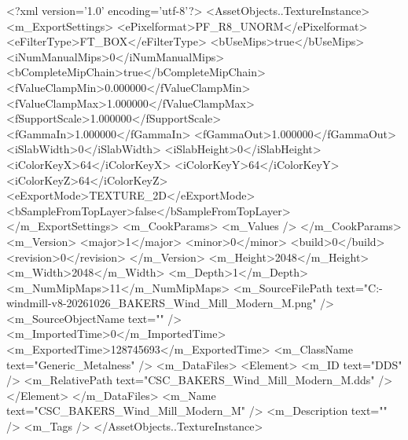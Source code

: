 <?xml version='1.0' encoding='utf-8'?>
<AssetObjects..TextureInstance>
  <m_ExportSettings>
    <ePixelformat>PF_R8_UNORM</ePixelformat>
    <eFilterType>FT_BOX</eFilterType>
    <bUseMips>true</bUseMips>
    <iNumManualMips>0</iNumManualMips>
    <bCompleteMipChain>true</bCompleteMipChain>
    <fValueClampMin>0.000000</fValueClampMin>
    <fValueClampMax>1.000000</fValueClampMax>
    <fSupportScale>1.000000</fSupportScale>
    <fGammaIn>1.000000</fGammaIn>
    <fGammaOut>1.000000</fGammaOut>
    <iSlabWidth>0</iSlabWidth>
    <iSlabHeight>0</iSlabHeight>
    <iColorKeyX>64</iColorKeyX>
    <iColorKeyY>64</iColorKeyY>
    <iColorKeyZ>64</iColorKeyZ>
    <eExportMode>TEXTURE_2D</eExportMode>
    <bSampleFromTopLayer>false</bSampleFromTopLayer>
  </m_ExportSettings>
  <m_CookParams>
    <m_Values />
  </m_CookParams>
  <m_Version>
    <major>1</major>
    <minor>0</minor>
    <build>0</build>
    <revision>0</revision>
  </m_Version>
  <m_Height>2048</m_Height>
  <m_Width>2048</m_Width>
  <m_Depth>1</m_Depth>
  <m_NumMipMaps>11</m_NumMipMaps>
  <m_SourceFilePath text="C:\Users\Shadow\Desktop\Codex\modern-windmill-v8-20261026\export\textures\CSC_BAKERS_Wind_Mill_Modern_M.png" />
  <m_SourceObjectName text="" />
  <m_ImportedTime>0</m_ImportedTime>
  <m_ExportedTime>128745693</m_ExportedTime>
  <m_ClassName text="Generic_Metalness" />
  <m_DataFiles>
    <Element>
      <m_ID text="DDS" />
      <m_RelativePath text="CSC_BAKERS_Wind_Mill_Modern_M.dds" />
    </Element>
  </m_DataFiles>
  <m_Name text="CSC_BAKERS_Wind_Mill_Modern_M" />
  <m_Description text="" />
  <m_Tags />
</AssetObjects..TextureInstance>